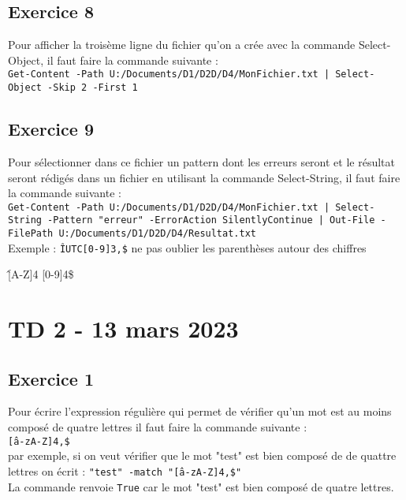 \documentclass[12pt, a4paper]{article}
\begin{document}
\subsection{Exercice 8}
Pour afficher la troisème ligne du fichier qu'on a crée avec la commande Select-Object,
il faut faire la commande suivante :\\

\texttt{Get-Content -Path U:/Documents/D1/D2D/D4/MonFichier.txt | Select-Object -Skip 2 -First 1}\\

\subsection{Exercice 9}
Pour sélectionner dans ce fichier un pattern dont les erreurs seront et le résultat 
seront rédigés dans un fichier en utilisant la commande Select-String, il faut faire
la commande suivante :\\

\texttt{Get-Content -Path U:/Documents/D1/D2D/D4/MonFichier.txt | Select-String -Pattern "erreur" -ErrorAction SilentlyContinue | Out-File -FilePath U:/Documents/D1/D2D/D4/Resultat.txt}\\

Exemple : \texttt{\^IUTC[0-9]{3,}\$}
ne pas oublier les parenthèses autour des chiffres

\^[A-Z]{4} [0-9]{4}\$

\section{TD 2 - 13 mars 2023}
\subsection{Exercice 1}
Pour écrire l’expression régulière qui permet de vérifier qu’un mot est au moins composé de quatre lettres il 
faut faire la commande suivante :\\

\texttt{\^[a-zA-Z]{4,}\$}\\

par exemple, si on veut vérifier que le mot "test" est bien composé de de quattre lettres on écrit : 
\texttt{"test" -match "\^[a-zA-Z]{4,}\$"}\\

La commande renvoie \texttt{True} car le mot "test" est bien composé de quatre lettres.\\
\end{document}

